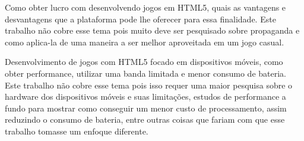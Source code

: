Como obter lucro com desenvolvendo jogos em HTML5, quais as vantagens
e desvantagens que a plataforma pode lhe oferecer para essa
finalidade. Este trabalho não cobre esse tema pois muito deve ser
pesquisado sobre propaganda e como aplica-la de uma maneira a ser
melhor aproveitada em um jogo casual.

Desenvolvimento de jogos com HTML5 focado em dispositivos móveis, como
obter performance, utilizar uma banda limitada e menor consumo de
bateria. Este trabalho não cobre esse tema pois isso requer uma maior
pesquisa sobre o hardware dos dispositivos móveis e suas limitações,
estudos de performance a fundo para mostrar como conseguir um menor
custo de processamento, assim reduzindo o consumo de bateria, entre
outras coisas que fariam com que esse trabalho tomasse um enfoque
diferente.
